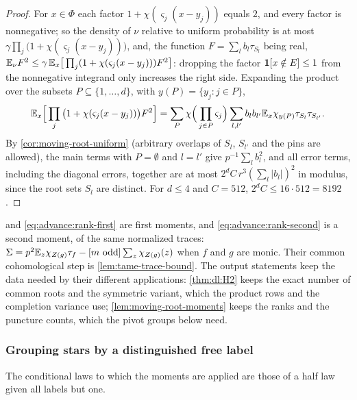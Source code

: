 \begin{proof}
For $x\in\Phi$ each factor $1+\chi(\varsigma_j(x-y_j))$ equals $2$, and every
factor is nonnegative; so the density of $\nu$ relative to uniform probability is
at most $\gamma\prod_j\big(1+\chi(\varsigma_j(x-y_j))\big)$, and, the function
$F=\sum_lb_l\tau_{S_l}$ being real, $\mathbb E_\nu F^2\le\gamma\,\mathbb E_x\big[\prod_j(1+\chi(\varsigma_j(x-y_j)))F^2\big]$:
dropping the factor $\mathbf 1[x\notin E]\le1$ from the nonnegative integrand only increases the right side. Expanding the product
over the subsets $P\subseteq\{1,\dots,d\}$, with $y(P)=\{y_j:j\in P\}$,
\[
  \mathbb E_x\Big[\prod_j\big(1+\chi(\varsigma_j(x-y_j))\big)F^2\Big]
  =\sum_P\chi\Big(\prod_{j\in P}\varsigma_j\Big)\sum_{l,l'}b_lb_{l'}
  \mathbb E_x\chi_{y(P)}\tau_{S_l}\tau_{S_{l'}}.
\]
By \cref{cor:moving-root-uniform} (arbitrary overlaps of $S_l$, $S_{l'}$ and the
pins are allowed), the main terms with $P=\emptyset$ and $l=l'$ give
$p^{-1}\sum_lb_l^2$, and all error terms, including the diagonal errors, together are at most
$2^dC\,r^3(\sum_l|b_l|)^2$ in modulus, since the root sets $S_l$ are distinct.
For $d\le4$ and $C=512$, $2^dC\le16\cdot512=8192$.
\end{proof}

\begin{remark}\label{rem:trace-moment-family}
 and \eqref{eq:advance:rank-first} are first moments, and
\eqref{eq:advance:rank-second} is a second moment, of the same normalized
traces: $\Sigma=p^2\mathbb E_z\chi_{Z(g)}\tau_f-[m\text{ odd}]\sum_z\chi_{Z(g)}(z)$ when
$f$ and $g$ are monic. Their common cohomological step is \cref{lem:tame-trace-bound}.
The output statements keep the data needed by their different applications: \cref{thm:dl:H2} keeps the exact number of common roots and the
symmetric variant, which the product rows and the completion variance use;
\cref{lem:moving-root-moments} keeps the ranks and the puncture counts, which
the pivot groups below need.
\end{remark}

\subsubsection{Grouping stars by a distinguished free label}\label{subsec:advance:ordered-star}

The conditional laws to which the moments are applied are those of a half
law given all labels but one.

